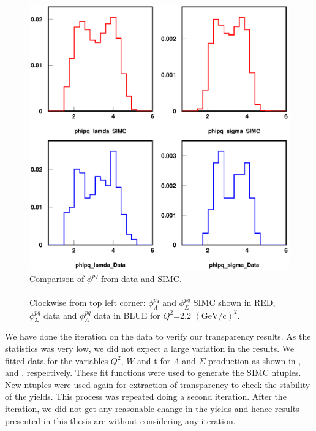 \begin{figure}[!tbp]
  \centering
  \includegraphics[width=0.8\columnwidth]{com_plot_phi_2}
  \caption[Comparison of $\phi^{pq}$ from data and SIMC.]{\label{fig:com_plot_phi_2}Comparison of $\phi^{pq}$ from data and SIMC.\\\\ Clockwise from top left corner: $\phi^{pq}_\Lambda$ and $\phi^{pq}_\Sigma$ SIMC shown in RED, $\phi^{pq}_\Sigma$ data and $\phi^{pq}_\Lambda$ data in BLUE for $Q^2$=2.2 $(\mathrm{GeV/c})^2$.}
\end{figure}

We have done the iteration on the data to verify our transparency results. As the statistics was very low, we did not expect a large variation in the results. We fitted data for the variables $Q^2$, $W$ and t for $\Lambda$ and $\Sigma$ production as shown in ,  and , respectively. These fit functions were used to generate the SIMC ntuples. New ntuples were used again for extraction of transparency to check the stability of the yields. This process was repeated doing a second iteration. After the iteration, we did not get any reasonable change in the yields and hence results presented in this thesis are without considering any iteration.

